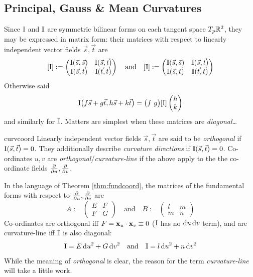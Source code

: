 \clearpage



\subsection{Principal, Gauss \& Mean Curvatures}\label{sec:principalcurv}

Since $\mathrm{I}$ and $\mathbb{I}$ are symmetric bilinear forms on each tangent space $T_p\mathbb{R}^2$, they may be expressed in matrix form: their matrices with respect to linearly independent vector fields $\vec s,\vec t$ are
\[
	[\mathrm{I}]:=
	\begin{pmatrix}
  	\mathrm{I}(\vec s,\vec s)&\mathrm{I}(\vec s,\vec t)\\
  	\mathrm{I}(\vec s,\vec t)&\mathrm{I}(\vec t,\vec t)
	\end{pmatrix}
	\quad\text{and}\quad
	[\mathbb{I}]:=
	\begin{pmatrix}
  	\mathbb{I}(\vec s,\vec s)&\mathbb{I}(\vec s,\vec t)\\
  	\mathbb{I}(\vec s,\vec t)&\mathbb{I}(\vec t,\vec t)
	\end{pmatrix}\]
	Otherwise said
	\[
		\mathrm{I}\bigl(f\vec s+g\vec t,h\vec s+k\vec t\bigr)=\bigl(f\ g\bigr)[\mathrm{I}]\begin{pmatrix}h\\k\end{pmatrix}
	\]
	and similarly for $\mathbb{I}$. Matters are simplest when these matrices are \emph{diagonal\ldots}


\begin{defn}{}{curvcoord}
	Linearly independent vector fields $\vec s,\vec t$ are said to be \emph{orthogonal} if $\mathrm{I}(\vec s,\vec t)=0$. They additionally describe \emph{curvature directions} if $\mathbb{I}(\vec s,\vec t)=0$.\smallbreak
	Co-ordinates $u,v$ are \emph{orthogonal}/\emph{curvature-line} if the above apply to the the co-ordinate fields $\frac{\partial }{\partial u},\frac{\partial }{\partial v}$.
\end{defn}

In the language of Theorem \ref{thm:fundcoord}, the matrices of the fundamental forms with respect to $\frac{\partial }{\partial u},\frac{\partial }{\partial v}$ are 
\[
	A:=
	\begin{pmatrix}
  	E&F\\F&G
	\end{pmatrix}
	\quad\text{and}\quad
	B:=
	\begin{pmatrix}
  	l&m\\m&n
	\end{pmatrix}
	\tag{$\ast$}
\]
Co-ordinates are orthogonal iff $F={\mathbf{x}}_u\cdot{\mathbf{x}}_v\equiv 0$ ($\mathrm{I}$ has no ${\mathrm{d} u}\,{\mathrm{d} v}$ term), and are curvature-line iff $\mathbb{I}$ is also diagonal:
\[
	\mathrm{I}=E\,{\mathrm{d} u}^2+G\,{\mathrm{d} v}^2\quad\text{and}\quad \mathbb{I}=l\,{\mathrm{d} u}^2+n\,{\mathrm{d} v}^2
\]
While the meaning of \emph{orthogonal} is clear, the reason for the term \emph{curvature-line} will take a little work.


